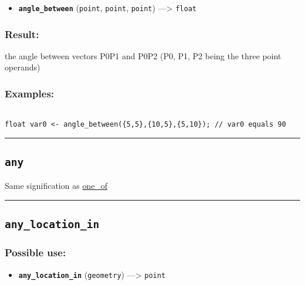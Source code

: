\documentclass[]{book}
\providecommand{\tightlist}{%
  \setlength{\itemsep}{0pt}\setlength{\parskip}{0pt}}
\theoremstyle{definition}
\theoremstyle{definition}
\theoremstyle{definition}
\theoremstyle{remark}
\begin{document}
\begin{itemize}
\tightlist
\item
  \textbf{\texttt{angle\_between}} (\texttt{point}, \texttt{point},
  \texttt{point}) ---\textgreater{} \texttt{float}
\end{itemize}

\subsubsection{Result:}\label{result-36}

the angle between vectors P0P1 and P0P2 (P0, P1, P2 being the three
point operands)

\subsubsection{Examples:}\label{examples-29}

\begin{verbatim}
 
float var0 <- angle_between({5,5},{10,5},{5,10}); // var0 equals 90
\end{verbatim}

\begin{center}\rule{0.5\linewidth}{\linethickness}\end{center}

\subsection{\texorpdfstring{\texttt{any}}{any}}\label{any}

Same signification as \href{operators-n-to-r.html\#one_of}{one\_of}

\begin{center}\rule{0.5\linewidth}{\linethickness}\end{center}

\subsection{\texorpdfstring{\texttt{any\_location\_in}}{any\_location\_in}}\label{any_location_in}

\subsubsection{Possible use:}\label{possible-use-38}

\begin{itemize}
\tightlist
\item
  \textbf{\texttt{any\_location\_in}} (\texttt{geometry})
  ---\textgreater{} \texttt{point}
\end{itemize}
\end{document}
